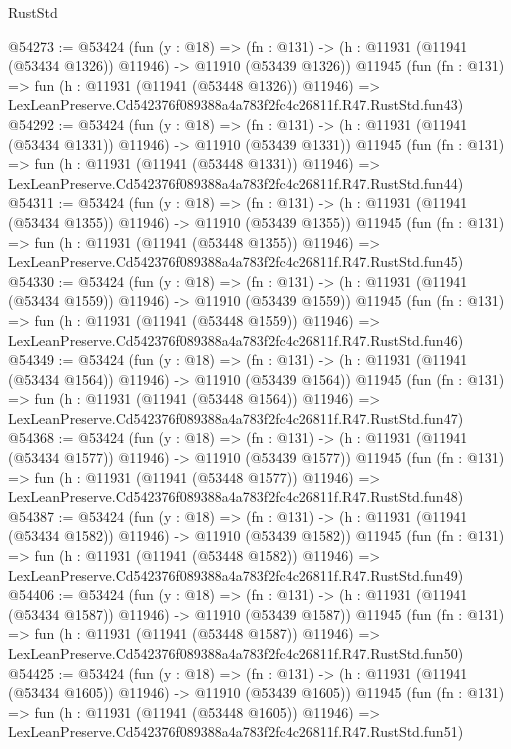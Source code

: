 \begin{lexlean}{RustStd}
\begin{coremodule}
@54273 := @53424
    (fun (y : @18) =>
    (fn : @131) -> (h : @11931 (@11941 (@53434 @1326)) @11946) -> @11910 (@53439 @1326))
    @11945
    (fun (fn : @131) =>
    fun (h : @11931 (@11941 (@53448 @1326)) @11946) =>
    LexLeanPreserve.Cd542376f089388a4a783f2fc4c26811f.R47.RustStd.fun43)
@54292 := @53424
    (fun (y : @18) =>
    (fn : @131) -> (h : @11931 (@11941 (@53434 @1331)) @11946) -> @11910 (@53439 @1331))
    @11945
    (fun (fn : @131) =>
    fun (h : @11931 (@11941 (@53448 @1331)) @11946) =>
    LexLeanPreserve.Cd542376f089388a4a783f2fc4c26811f.R47.RustStd.fun44)
@54311 := @53424
    (fun (y : @18) =>
    (fn : @131) -> (h : @11931 (@11941 (@53434 @1355)) @11946) -> @11910 (@53439 @1355))
    @11945
    (fun (fn : @131) =>
    fun (h : @11931 (@11941 (@53448 @1355)) @11946) =>
    LexLeanPreserve.Cd542376f089388a4a783f2fc4c26811f.R47.RustStd.fun45)
@54330 := @53424
    (fun (y : @18) =>
    (fn : @131) -> (h : @11931 (@11941 (@53434 @1559)) @11946) -> @11910 (@53439 @1559))
    @11945
    (fun (fn : @131) =>
    fun (h : @11931 (@11941 (@53448 @1559)) @11946) =>
    LexLeanPreserve.Cd542376f089388a4a783f2fc4c26811f.R47.RustStd.fun46)
@54349 := @53424
    (fun (y : @18) =>
    (fn : @131) -> (h : @11931 (@11941 (@53434 @1564)) @11946) -> @11910 (@53439 @1564))
    @11945
    (fun (fn : @131) =>
    fun (h : @11931 (@11941 (@53448 @1564)) @11946) =>
    LexLeanPreserve.Cd542376f089388a4a783f2fc4c26811f.R47.RustStd.fun47)
@54368 := @53424
    (fun (y : @18) =>
    (fn : @131) -> (h : @11931 (@11941 (@53434 @1577)) @11946) -> @11910 (@53439 @1577))
    @11945
    (fun (fn : @131) =>
    fun (h : @11931 (@11941 (@53448 @1577)) @11946) =>
    LexLeanPreserve.Cd542376f089388a4a783f2fc4c26811f.R47.RustStd.fun48)
@54387 := @53424
    (fun (y : @18) =>
    (fn : @131) -> (h : @11931 (@11941 (@53434 @1582)) @11946) -> @11910 (@53439 @1582))
    @11945
    (fun (fn : @131) =>
    fun (h : @11931 (@11941 (@53448 @1582)) @11946) =>
    LexLeanPreserve.Cd542376f089388a4a783f2fc4c26811f.R47.RustStd.fun49)
@54406 := @53424
    (fun (y : @18) =>
    (fn : @131) -> (h : @11931 (@11941 (@53434 @1587)) @11946) -> @11910 (@53439 @1587))
    @11945
    (fun (fn : @131) =>
    fun (h : @11931 (@11941 (@53448 @1587)) @11946) =>
    LexLeanPreserve.Cd542376f089388a4a783f2fc4c26811f.R47.RustStd.fun50)
@54425 := @53424
    (fun (y : @18) =>
    (fn : @131) -> (h : @11931 (@11941 (@53434 @1605)) @11946) -> @11910 (@53439 @1605))
    @11945
    (fun (fn : @131) =>
    fun (h : @11931 (@11941 (@53448 @1605)) @11946) =>
    LexLeanPreserve.Cd542376f089388a4a783f2fc4c26811f.R47.RustStd.fun51)

\end{coremodule}
\end{lexlean}
